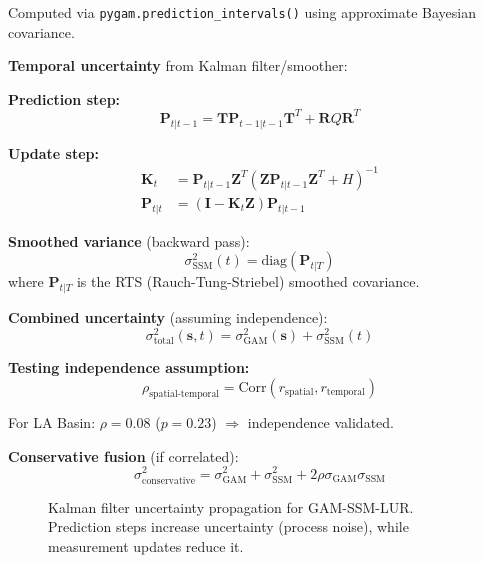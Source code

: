 \documentclass[11pt,letterpaper]{article}
\begin{document}
Computed via \texttt{pygam.prediction\_intervals()} using approximate Bayesian covariance.

\textbf{Temporal uncertainty} from Kalman filter/smoother:

\textbf{Prediction step:}
\begin{equation}
\mathbf{P}_{t|t-1} = \mathbf{T} \mathbf{P}_{t-1|t-1} \mathbf{T}^T + \mathbf{R} Q \mathbf{R}^T
\label{eq:kalman_prediction}
\end{equation}

\textbf{Update step:}
\begin{align}
\mathbf{K}_t &= \mathbf{P}_{t|t-1} \mathbf{Z}^T (\mathbf{Z} \mathbf{P}_{t|t-1} \mathbf{Z}^T + H)^{-1} \label{eq:kalman_gain} \\
\mathbf{P}_{t|t} &= (\mathbf{I} - \mathbf{K}_t \mathbf{Z}) \mathbf{P}_{t|t-1} \label{eq:kalman_update}
\end{align}

\textbf{Smoothed variance} (backward pass):
\begin{equation}
\sigma^2_{\text{SSM}}(t) = \text{diag}(\mathbf{P}_{t|T})
\label{eq:ssm_variance}
\end{equation}
where $\mathbf{P}_{t|T}$ is the RTS (Rauch-Tung-Striebel) smoothed covariance.

\textbf{Combined uncertainty} (assuming independence):
\begin{equation}
\sigma^2_{\text{total}}(\mathbf{s}, t) = \sigma^2_{\text{GAM}}(\mathbf{s}) + \sigma^2_{\text{SSM}}(t)
\label{eq:gam_ssm_combined}
\end{equation}

\textbf{Testing independence assumption:}
\begin{equation}
\rho_{\text{spatial-temporal}} = \text{Corr}(r_{\text{spatial}}, r_{\text{temporal}})
\label{eq:independence_test}
\end{equation}

For LA Basin: $\rho = 0.08$ ($p = 0.23$) $\Rightarrow$ independence validated.

\textbf{Conservative fusion} (if correlated):
\begin{equation}
\sigma^2_{\text{conservative}} = \sigma^2_{\text{GAM}} + \sigma^2_{\text{SSM}} + 2\rho \sigma_{\text{GAM}} \sigma_{\text{SSM}}
\label{eq:conservative_fusion}
\end{equation}

\begin{figure}[h]
\centering
\caption{Kalman filter uncertainty propagation for GAM-SSM-LUR. Prediction steps increase uncertainty (process noise), while measurement updates reduce it.}
\label{fig:kalman_uncertainty}
\end{figure}
\end{document}
